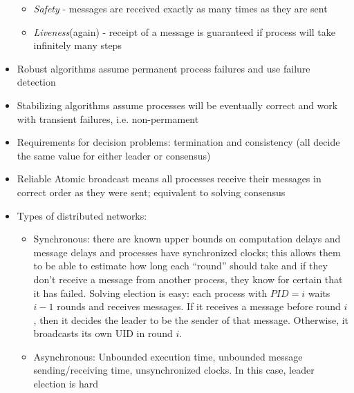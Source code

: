 \documentclass[a4paper,10pt,]{article}
\begin{document}
\begin{itemize}
\begin{itemize}
    \item \emph{Safety} - messages are received exactly as many times as they are sent
    \item \emph{Liveness}(again) - receipt of a message is guaranteed if process will take infinitely many steps
  \end{itemize}
  \item Robust algorithms assume permanent process failures and use failure detection
  \item Stabilizing algorithms assume processes will be eventually correct and work with transient failures, i.e. non-permament
  \item Requirements for decision problems: termination and consistency (all decide the same value for either leader or consensus)
  \item Reliable Atomic broadcast means all processes receive their messages in correct order as they were sent; equivalent to solving consensus
  \item Types of distributed networks:
  \begin{itemize}
    \item Synchronous: there are known upper bounds on computation delays and message delays and processes have synchronized clocks;  this allows them to be able to estimate how long each ``round'' should take and if they don't receive a message from another process, they know for certain that it has failed.  Solving election is easy: each process with $PID = i$ waits $i-1$ rounds and receives messages.  If it receives a message before round $i$, then it decides the leader to be the sender of that message.  Otherwise, it broadcasts its own UID in round $i$.
    \item Asynchronous: Unbounded execution time, unbounded message sending/receiving time, unsynchronized clocks.  In this case, leader election is hard
  \end{itemize}
\end{itemize}
\end{document}
